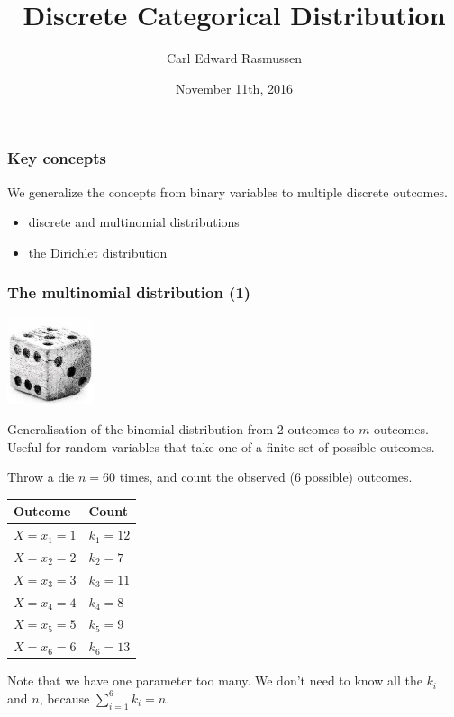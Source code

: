

\title{Discrete Categorical Distribution}
\author{Carl Edward Rasmussen}
\date{November 11th, 2016}




\begin{frame}
\titlepage
\end{frame}


\begin{frame}
\frametitle{Key concepts}

We generalize the concepts from binary variables to multiple discrete
outcomes.

\begin{itemize}
\item discrete and multinomial distributions
\item the Dirichlet distribution
\end{itemize}
\end{frame}


\begin{frame}
\frametitle{The multinomial distribution (1)}

\centerline{\includegraphics[width=0.19\textwidth]{die}}

Generalisation of the binomial distribution from 2 outcomes to $m$ outcomes.\\
Useful for random variables that take one of a finite set of possible outcomes. 

Throw a die $n=60$ times, and count the observed (6 possible) outcomes.
\begin{center}
\parbox{0.35\textwidth}{
\begin{tabular}{l l}
Outcome & Count\\
\hline
$X=x_1=1$ & $k_1=12$\\
$X=x_2=2$ & $k_2=7$\\
$X=x_3=3$ & $k_3=11$\\
$X=x_4=4$ & $k_4=8$\\
$X=x_5=5$ & $k_5=9$\\
$X=x_6=6$ & $k_6=13$\\
\hline
\end{tabular}
}
\parbox{0.58\textwidth}{
Note that we have one parameter too many. We don't need to know all
the $k_i$  and $n$, because $\sum_{i=1}^6 k_i=n$. 
}
\end{center}

\end{frame}

